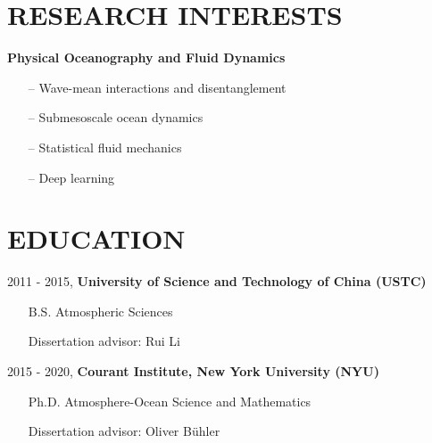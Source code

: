 \documentclass[margin]{res}
\begin{document}
\begin{resume}


\section{{\normalfont RESEARCH INTERESTS}}
\textbf{Physical Oceanography and Fluid Dynamics}
\begin{itemize}[leftmargin=*,noitemsep]
\item[--]{Wave-mean interactions and disentanglement}
\item[--]{Submesoscale ocean dynamics}
\item[--]{Statistical fluid mechanics}
\item[--]{Deep learning}
\end{itemize}

\section{{\normalfont EDUCATION}}
2011 - 2015, \textbf{University of Science and Technology of China (USTC)} 
\begin{itemize}[leftmargin=*,noitemsep]
\item[]{B.S. Atmospheric Sciences}
\item[]{Dissertation advisor: Rui Li}
\end{itemize}
\vspace*{-2.5mm}
2015 - 2020, \textbf{Courant Institute, New York University (NYU)} 
\begin{itemize}[leftmargin=*,noitemsep]
\item[]{Ph.D. Atmosphere-Ocean Science and Mathematics}
\item[]{Dissertation advisor: Oliver B{\"u}hler}
\end{itemize}



\end{resume}
\end{document}
